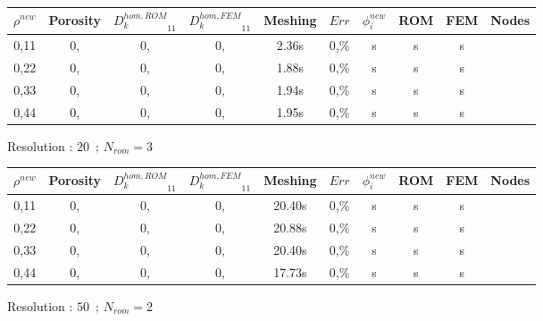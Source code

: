 {\begin{comment}
\begin{figure}[H]%
%
\begin{center}
\begin{tabular}{|c|c||c|c||c|c||c|c||c||c|}
\hline
\rowcolor{lightgray} $\rho^{new}$&Porosity&${D_k^{hom,ROM}}_{11}$&${D_k^{hom,FEM}}_{11}$&Meshing&$Err$&$\phi_i^{new}$&ROM&FEM&Nodes\\
\hline
0,11&0,&0,&0,&s&0,\%&s&s&s&\\
\hline
0,22&0,&0,&0,&s&0,\%&s&s&s&\\
\hline
0,33&0,&0,&0,&s&0,\%&s&s&s&\\
\hline
0,44&0,&0,&0,&s&0,\%&s&s&s&\\
\hline
\end{tabular}
\end{center}
\caption{Resolution : $10$\ ; $N_{rom}=4$}
%
\end{figure}
\end{comment}

\begin{figure}[H]%
%
\begin{center}
\begin{tabular}{|c|c||c|c||c|c||c|c||c||c|}
\hline
\rowcolor{lightgray} $\rho^{new}$&Porosity&${D_k^{hom,ROM}}_{11}$&${D_k^{hom,FEM}}_{11}$&Meshing&$Err$&$\phi_i^{new}$&ROM&FEM&Nodes\\
\hline
0,11&0,&0,&0,&2.36s&0,\%&s&s&s&\\
\hline
0,22&0,&0,&0,&1.88s&0,\%&s&s&s&\\
\hline
0,33&0,&0,&0,&1.94s&0,\%&s&s&s&\\
\hline
0,44&0,&0,&0,&1.95s&0,\%&s&s&s&\\
\hline
\end{tabular}
\end{center}
\caption{Resolution : $20$\ ; $N_{rom}=3$}
%
\end{figure}

\begin{figure}[H]%
%
\begin{center}
\begin{tabular}{|c|c||c|c||c|c||c|c||c||c|}
\hline
\rowcolor{lightgray} $\rho^{new}$&Porosity&${D_k^{hom,ROM}}_{11}$&${D_k^{hom,FEM}}_{11}$&Meshing&$Err$&$\phi_i^{new}$&ROM&FEM&Nodes\\
\hline
0,11&0,&0,&0,&20.40s&0,\%&s&s&s&\\
\hline
0,22&0,&0,&0,&20.88s&0,\%&s&s&s&\\
\hline
0,33&0,&0,&0,&20.40s&0,\%&s&s&s&\\
\hline
0,44&0,&0,&0,&17.73s&0,\%&s&s&s&\\
\hline
\end{tabular}
\end{center}
\caption{Resolution : $50$\ ; $N_{rom}=2$}
%
\end{figure}

}
